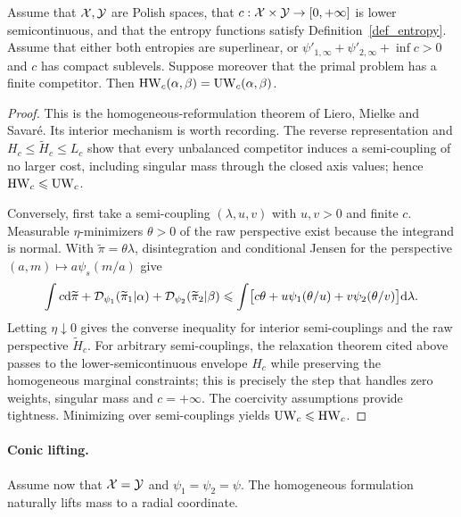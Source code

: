\begin{prop}\label{prop-homogeneous-unbalanced}
Assume that $\mathcal{X},\mathcal{Y}$ are Polish spaces, that $c:\mathcal{X}\times\mathcal{Y}\to[0,+\infty]$ is lower semicontinuous, and that the entropy functions satisfy Definition~\ref{def_entropy}. Assume that either both entropies are superlinear, or
$\psi'_{1,\infty}+\psi'_{2,\infty}+\inf c>0$ and $c$ has compact sublevels. Suppose moreover that the primal problem has a finite competitor. Then
$\operatorname{HW}_c(\alpha,\beta)=\operatorname{UW}_c(\alpha,\beta)$.
\end{prop}
\begin{proof}
This is the homogeneous-reformulation theorem of Liero, Mielke and Savar\'e. Its interior mechanism is worth recording. The reverse representation and $H_c\leq\widetilde H_c\leq L_c$ show that every unbalanced competitor induces a semi-coupling of no larger cost, including singular mass through the closed axis values; hence $\operatorname{HW}_c\leqslant\operatorname{UW}_c$.

Conversely, first take a semi-coupling $(\lambda,u,v)$ with $u,v>0$ and finite $c$. Measurable $\eta$-minimizers $\theta>0$ of the raw perspective exist because the integrand is normal. With $\widetilde\pi=\theta\lambda$, disintegration and conditional Jensen for the perspective $(a,m)\mapsto a\psi_s(m/a)$ give
\[
\int c\mathrm{d}\widetilde\pi
+\mathcal{D}_{\psi_1}(\widetilde\pi_1|\alpha)
+\mathcal{D}_{\psi_2}(\widetilde\pi_2|\beta)
\leqslant
\int\bigl[c\theta+u\psi_1(\theta/u)+v\psi_2(\theta/v)\bigr]\mathrm{d}\lambda.
\]
Letting $\eta\downarrow0$ gives the converse inequality for interior semi-couplings and the raw perspective $\widetilde H_c$. For arbitrary semi-couplings, the relaxation theorem cited above passes to the lower-semicontinuous envelope $H_c$ while preserving the homogeneous marginal constraints; this is precisely the step that handles zero weights, singular mass and $c=+\infty$. The coercivity assumptions provide tightness. Minimizing over semi-couplings yields $\operatorname{UW}_c\leqslant\operatorname{HW}_c$.
\end{proof}
\paragraph{Conic lifting.}
Assume now that $\mathcal{X}=\mathcal{Y}$ and $\psi_1=\psi_2=\psi$. The homogeneous formulation naturally lifts mass to a radial coordinate.

